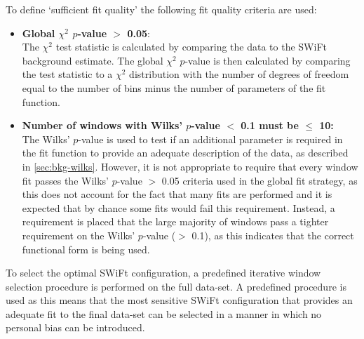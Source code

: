 \newpage
\noindent
To define `sufficient fit quality' the following fit quality criteria are used:
\begin{itemize}[leftmargin=*]  
\item \textbf{Global $\chi^{2}$ \mbox{$p$-value} $>$ 0.05}:\\
  The $\chi^{2}$ test statistic is calculated by comparing the data to the SWiFt background estimate.
  The global $\chi^{2}$ \mbox{$p$-value} is then calculated by comparing the test statistic
  to a $\chi^{2}$ distribution with the number of degrees of freedom equal to the number of bins
  minus the number of parameters of the fit function.\vspace{0.5em}
\item \textbf{Number of windows with Wilks' \mbox{$p$-value} $<$ 0.1 must be $\leq$ 10:}\\
  The Wilks' \mbox{$p$-value} is used to test if an additional parameter is required in the fit function
  to provide an adequate description of the data, as described in \ref{sec:bkg-wilks}. 
  However, it is not appropriate to require that every window fit passes the Wilks' $p$-value $>$ 0.05 criteria used in the global fit strategy,
  as this does not account for the fact that many fits are performed and it is expected that by chance some fits would fail this requirement.
  Instead, a requirement is placed that the large majority of windows pass a tighter requirement on the Wilks' $p$-value ($>$ 0.1),
  as this indicates that the correct functional form is being used.
\end{itemize}

To select the optimal SWiFt configuration, a predefined iterative window selection procedure is performed on the full \lm{} data-set.
A predefined procedure is used as this means that the most sensitive SWiFt configuration that provides an adequate fit to the final data-set can be selected
in a manner in which no personal bias can be introduced.



